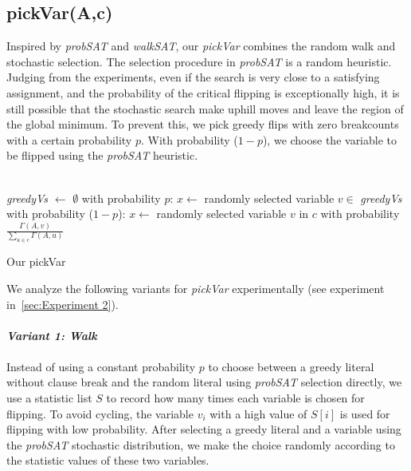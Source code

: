 \documentclass[12pt,a4paper,twoside]{scrartcl}
\numberwithin{equation}{section}
\begin{document}
\subsection{pickVar(A,c)}
Inspired by \emph{probSAT} and \emph{walkSAT}, our \emph{pickVar} combines the random walk and stochastic selection. 
The selection procedure in \emph{probSAT} is a random heuristic. Judging from the experiments, even if the search is very close to a satisfying assignment, and the probability of the critical flipping is exceptionally high, it is still possible that the stochastic search make uphill moves and leave the region of the global minimum. To prevent this,  we pick greedy flips with zero breakcounts with a certain probability $p$. With probability ($1-p$), we choose the variable to be flipped using the \emph{probSAT} heuristic.\\
\\
\begin{algorithm}[H]
 \emph{greedyVs} $\leftarrow$ $\emptyset$\;
  with probability $p$: $x \leftarrow$ randomly selected variable $v \in$ \emph{greedyVs} \;
  with probability ($1-p$):   $x \leftarrow$ randomly selected  variable $v$ in $c$ with probability $\frac{\Gamma(A,v)}{\sum_{u \in c}\Gamma(A,u)}$
\caption{Our pickVar}
\end{algorithm}  
We analyze the following variants for  \emph{pickVar} experimentally (see experiment in~\ref{sec:Experiment 2}).\\
\\ 
 \emph{\textbf{Variant 1: Walk}}\\
\\
Instead of using a constant probability $p$ to choose between a greedy literal without clause break and the random literal using \emph{probSAT} selection directly, we use a statistic list $S$ to record how many times each variable is chosen for flipping. To avoid cycling, the variable $v_i$ with a high value of $S[i]$ is used for flipping with low probability. After selecting a greedy literal and a variable using the \emph{probSAT} stochastic distribution, we make the choice randomly according to the statistic values of these two variables.\\
 \\
\end{document}
